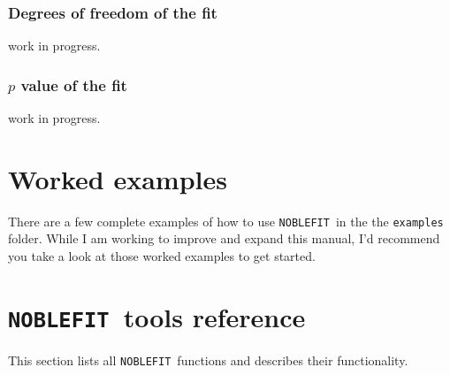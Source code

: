 \documentclass[12pt]{article}
\newcommand{\noblefit}{{\tt NOBLEFIT}}
\begin{document}
\subsubsection{Degrees of freedom of the fit}
work in progress.

\subsubsection{$p$ value of the fit}
work in progress.

\section{Worked examples}
There are a few complete examples of how to use \noblefit\ in the the {\tt examples} folder. While I am working to improve and expand this manual, I'd recommend you take a look at those worked examples to get started.


\section{\noblefit\  tools reference}\label{sec:tools_ref}
This section lists all \noblefit\ functions and describes their functionality.





\end{document}
